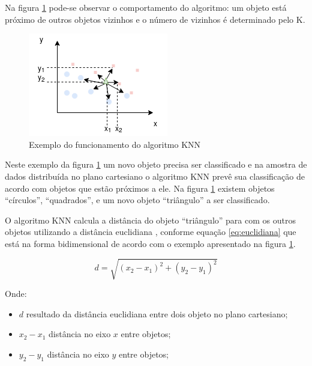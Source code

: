 Na figura \ref{fig:knn} pode-se observar o comportamento do algoritmo:  um objeto está próximo de outros objetos vizinhos e o número de vizinhos é determinado pelo K.

\begin{figure}[h!]
    \centering
    \includegraphics[scale=0.9]{figs/ex_knn1.png}
    
    
    \caption{Exemplo do funcionamento do algoritmo KNN} 
    \label{fig:knn}     
\end{figure}

Neste exemplo da figura \ref{fig:knn} um novo objeto precisa ser classificado e na amostra de dados distribuída no plano cartesiano o algoritmo KNN prevê sua classificação de acordo com objetos que estão próximos a ele. Na figura \ref{fig:knn} existem objetos ``círculos'', ``quadrados'', e um novo objeto ``triângulo'' a ser classificado. 

O algoritmo KNN calcula a distância do objeto ``triângulo'' para com os outros objetos utilizando a distância euclidiana \cite{Lachi2005}, conforme equação \ref{eq:euclidiana} que está na forma bidimensional de acordo com o exemplo apresentado na figura \ref{fig:knn}.

\begin{equation}
d=\sqrt{(x_2-x_1)^2 + (y_2-y_1)^2}
 \label{eq:euclidiana}
\end{equation}

Onde:
\begin{itemize}[noitemsep]
 \item ${d}$ resultado da distância euclidiana entre dois objeto no plano cartesiano;
 \item ${x_2-x_1}$ distância no eixo ${x}$ entre objetos;%
 \item ${y_2-y_1}$ distância no eixo ${y}$ entre  objetos;%
\end{itemize}

